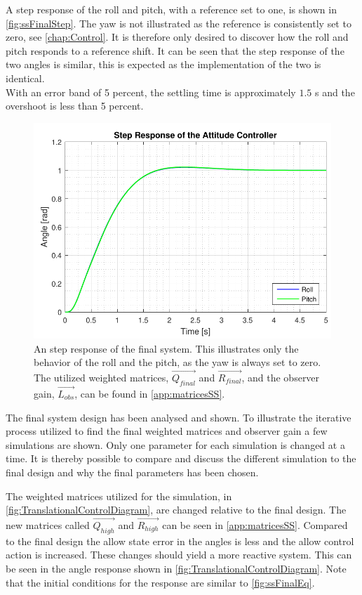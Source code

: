 %
A step response of the roll and pitch, with a reference set to one, is shown in \autoref{fig:ssFinalStep}. The yaw is not illustrated as the reference is consistently set to zero, see \autoref{chap:Control}. It is therefore only desired to discover how the roll and pitch responds to a reference shift. It can be seen that the step response of the two angles is similar, this is expected as the implementation of the two is identical. \\ With an error band of 5 percent, the settling time is approximately $1.5$ \si{s} and the overshoot is less than 5 percent. 
%
\begin{figure}[H]
	\centering
	\includegraphics[scale=0.8]{figures/ssFinalStep.pdf}
	\caption{An step response of the final system. This illustrates only the behavior of the roll and the pitch, as the yaw is always set to zero. The utilized weighted matrices, $\vec{Q_{final}}$ and $\vec{R_{final}}$, and the observer gain, $\vec{L_{obs}}$, can be found in \autoref{app:matricesSS}.}
	\label{fig:ssFinalStep}
\end{figure}
%
The final system design has been analysed and shown. To illustrate the iterative process utilized to find the final weighted matrices and observer gain a few simulations are shown. Only one parameter for each simulation is changed at a time. It is thereby possible to compare and discuss the different simulation to the final design and why the final parameters has been chosen.

The weighted matrices utilized for the simulation, in \autoref{fig:TranslationalControlDiagram}, are changed relative to the final design. The new matrices called $\vec{Q_{high}}$ and $\vec{R_{high}}$ can be seen in \autoref{app:matricesSS}. Compared to the final design the allow state error in the angles is less and the allow control action is increased. These changes should yield a more reactive system. This can be seen in the angle response shown in \autoref{fig:TranslationalControlDiagram}. Note that the initial conditions for the response are similar to \autoref{fig:ssFinalEq}.

